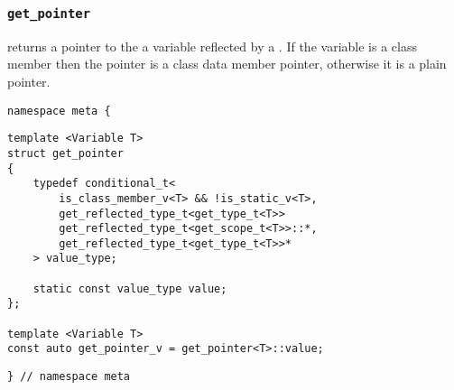 

\subsubsection{\texttt{get\_pointer}}

returns a pointer to the a variable reflected by a .   If the variable is a class member then the pointer is a class data member pointer,   otherwise it is a plain pointer.

\begin{verbatim}
namespace meta {
\end{verbatim}
\begin{verbatim}
template <Variable T>
struct get_pointer
{
	typedef conditional_t<
		is_class_member_v<T> && !is_static_v<T>,
		get_reflected_type_t<get_type_t<T>>
		get_reflected_type_t<get_scope_t<T>>::*,
		get_reflected_type_t<get_type_t<T>>*
	> value_type;

	static const value_type value;
};
	
template <Variable T>
const auto get_pointer_v = get_pointer<T>::value;
\end{verbatim}
\begin{verbatim}
} // namespace meta
\end{verbatim}

